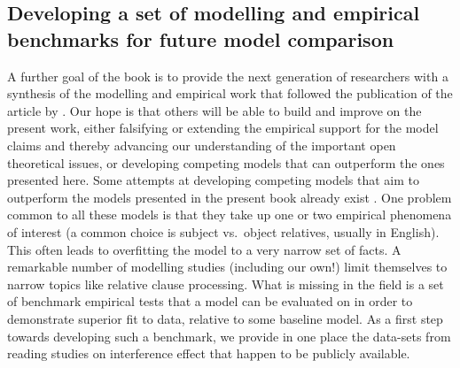 \documentclass{cambridge7A}\usepackage[]{graphicx}\usepackage[]{color}
\begin{document}
\subsection{Developing a set of modelling and empirical benchmarks for future model comparison}

A further goal of the book is to provide the next generation of researchers with a synthesis of the modelling and empirical work that followed the publication of the article by
\cite{LewisVasishth2005}. Our hope is that others will be able to build and improve on the present work, either falsifying or extending the empirical support for the model claims and thereby advancing our understanding of the important open theoretical issues, or developing competing models that can outperform the ones presented here.  Some  attempts at developing competing models that aim to outperform the models presented in the present book already exist \citep{SmithFranckTaborCogSci2018,rasmussen2017left,cho2017incremental,parker2019cue}. One problem common to all these models is that they take up one or two empirical phenomena of interest (a common choice is subject vs.\
object relatives, usually in English). This often leads to overfitting the model to a very narrow set of facts. A remarkable number of modelling studies (including our own!) limit themselves to narrow topics like relative clause processing.  What is missing in the field is a set of  benchmark empirical tests that a model can be evaluated on in order to demonstrate superior fit to data, relative to some baseline model. As a first step towards developing such a benchmark, we provide in one place the data-sets from reading studies on interference effect that happen to be publicly available.
\end{document}
